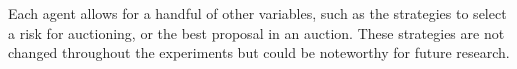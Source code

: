 Each agent allows for a handful of other variables, such as the strategies to select a risk for auctioning, or the best proposal in an auction. These strategies are not changed throughout the experiments but could be noteworthy for future research.






